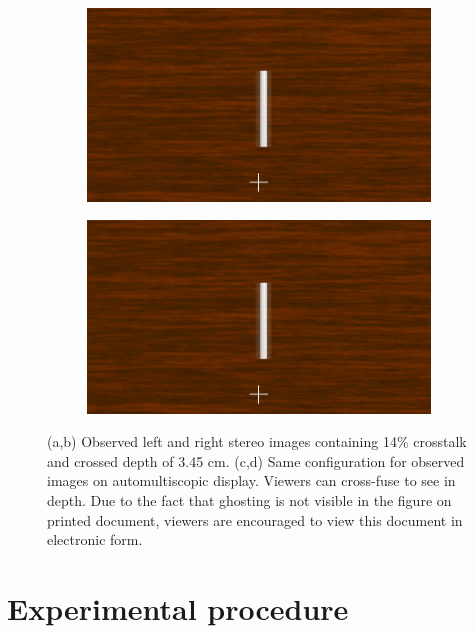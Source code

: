 \begin{figure}[htbp]
    \begin{subfigure}[b]{0.5\textwidth}
        \includegraphics[width=\textwidth]{./Template_Figures/auto_ghost_left}
        \caption{}\label{fig:obs_aut_left}
    \end{subfigure}
    \begin{subfigure}[b]{0.5\textwidth}
        \includegraphics[width=\textwidth]{./Template_Figures/auto_ghost_left}
        \caption{}\label{fig:obs_aut_right}
    \end{subfigure}
    \caption{(a,b) Observed left and right stereo images containing 14\% crosstalk and crossed depth of 3.45 cm. (c,d) Same configuration for observed images on automultiscopic display. Viewers can cross-fuse to see in depth. Due to the fact that ghosting is not visible in the figure on printed document, viewers are encouraged to view this document in electronic form.\label{fig:observed_ct_images}}
\end{figure}

\section{Experimental procedure}
